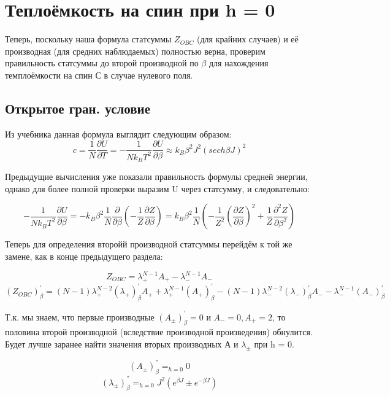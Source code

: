 \documentclass{article}
\newcommand{\bj}{\beta J}
\newcommand{\lp}{\lambda_{+}}
\newcommand{\lm}{\lambda_{-}}
\newcommand{\lpm}{\lambda_{\pm}}
\newcommand{\obc}{_{OBC}}
\newcommand{\dzdb}{\frac{\partial Z}{\partial \beta}}
\newcommand{\prpb}{^{'}_{\beta}}
\newcommand{\vprpb}{^{''}_{\beta}}
\numberwithin{equation}{section}
\begin{document}

\section{Теплоёмкость на спин при h = 0}
Теперь, поскольку наша формула статсуммы $Z_{OBC}$ (для крайних случаев) и её производная (для средних наблюдаемых) полностью верна, проверим правильность статсуммы до второй производной по $\beta$ для нахождения темплоёмкости на спин С в случае нулевого поля.

\subsection{Открытое гран. условие}

Из учебника данная формула выглядит следующим образом:
\[ c = \frac{1}{N} \frac{\partial U}{\partial T} = - \frac{1}{N k_{B} T^{2}} \frac{\partial U}{\partial \beta} \approx k_{B} \beta^{2} J^{2} (sech \bj)^{2} \]

Предыдущие вычисления уже показали правильность формулы средней энергии, однако для более полной проверки выразим U через статсумму, и следовательно:

\[ -\frac{1}{N k_{B} T^{2}} \frac{\partial U}{\partial \beta} = - k_{B} \beta^{2} \frac{1}{N} \frac{\partial}{\partial \beta} (- \frac{1}{Z} \dzdb) = k_{B} \beta^{2} \frac{1}{N} (- \frac{1}{Z^{2}} (\dzdb)^{2} + \frac{1}{Z} \frac{\partial^{2} Z}{\partial \beta^{2}}) \]

Теперь для определения второйй производной статсуммы перейдём к той же замене, как в конце предыдущего раздела:

\[ Z\obc = \lp^{N-1} A_{+} - \lm^{N-1} A_{-} \]
\[ (Z\obc)\prpb = (N-1) \lp^{N-2} (\lp)\prpb A_{+} + \lp^{N-1} (A_{+})\prpb - (N-1) \lm^{N-2} (\lm)\prpb A_{-} - \lm^{N-1} (A_{-})\prpb \]

Т.к. мы знаем, что первые производные $(A_{\pm})\prpb = 0$ и $A_{-} = 0, A_{+} = 2$, то половина второй производной (вследствие производной произведения) обнулится. Будет лучше заранее найти значения вторых производных А и $\lpm$ при h = 0.

\[ (A_{\pm})\vprpb =_{h=0} 0 \]
\[ (\lpm)\vprpb =_{h=0} J^{2}(e^{\bj} \pm e^{-\bj}) \]
\end{document}
